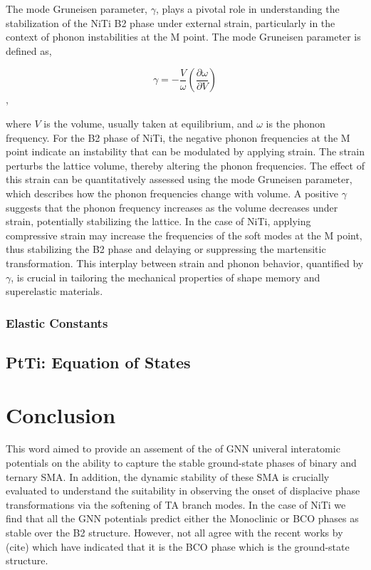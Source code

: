 \documentclass[preprint]{elsarticle}
\begin{document}
The mode Gruneisen parameter, $\gamma$, plays a pivotal role in understanding the stabilization of the NiTi B2 phase under external strain, particularly in the context of phonon instabilities at the M point. The mode Gruneisen parameter is defined as,

\begin{equation}
  \label{eq:modegruneisen}
  \gamma = -\frac{V}{\omega}\left(\frac{\partial \omega}{\partial V}\right)
\end{equation},

where $V$ is the volume, usually taken at equilibrium, and $\omega$ is the phonon frequency. For the B2 phase of NiTi, the negative phonon frequencies at the M point indicate an instability that can be modulated by applying strain. The strain perturbs the lattice volume, thereby altering the phonon frequencies. The effect of this strain can be quantitatively assessed using the mode Gruneisen parameter, which describes how the phonon frequencies change with volume. A positive $\gamma$ suggests that the phonon frequency increases as the volume decreases under strain, potentially stabilizing the lattice. In the case of NiTi, applying compressive strain may increase the frequencies of the soft modes at the M point, thus stabilizing the B2 phase and delaying or suppressing the martensitic transformation. This interplay between strain and phonon behavior, quantified by $\gamma$, is crucial in tailoring the mechanical properties of shape memory and superelastic materials.



\subsubsection{Elastic Constants}



\subsection{PtTi: Equation of States}
\label{sec:ptti_eos}



\section{Conclusion}
\label{sec:conclusion}
This word aimed to provide an assement of the of GNN univeral interatomic potentials on the ability to capture the stable ground-state phases of binary and ternary SMA. In addition, the dynamic stability of these SMA is crucially evaluated to understand the suitability in observing the onset of displacive phase transformations via the softening of TA branch modes. In the case of NiTi we find that all the GNN potentials predict either the Monoclinic or BCO phases as stable over the B2 structure. However, not all agree with the recent works by (cite) which have indicated that it is the BCO phase which is the ground-state structure.
\end{document}
